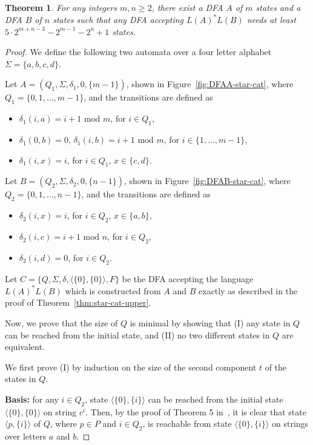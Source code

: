 \documentclass[10pt]{article}
\newtheorem{theorem}{Theorem}
\begin{document}
\begin{theorem}\label{thm:star-cat-lower}
For any integers $m,n \ge 2$, there exist a DFA $A$ of $m$ states and a DFA $B$ of $n$ states such that any DFA accepting $L(A)^* L(B)$ needs at least $5 \cdot 2^{m+n-3} - 2^{m-1} - 2^n +1$ states.
\end{theorem}
\begin{proof}
We define the following two automata over a four letter alphabet $\Sigma = \{a,b,c,d\}$.

Let $A = (Q_1, \Sigma, \delta_1, 0, \{m-1\})$, shown in Figure~\ref{fig:DFAA-star-cat}, where $Q_1 = \{0,1,\ldots,m-1\}$, and the transitions are defined as
    \begin{itemize}
    \item $\delta_1 (i, a) = i+1 \mbox{ mod } m$, for $i \in Q_1$,
    \item $\delta_1 (0, b) = 0$, $\delta_1 (i, b) = i+1 \mbox{ mod } m$, for $i \in \{1, \ldots, m-1\}$,
    \item $\delta_1 (i, x) = i$, for $i \in Q_1$, $x \in \{c,d\}$.
    \end{itemize}

Let $B = (Q_2, \Sigma, \delta_2, 0, \{n-1\})$, shown in Figure~\ref{fig:DFAB-star-cat}, where $Q_2 = \{0,1,\ldots,n-1\}$, and the transitions are defined as
    \begin{itemize}
    \item $\delta_2 (i, x) = i$, for $i \in Q_2$, $x \in \{a,b\}$,
    \item $\delta_2 (i, c) = i+1 \mbox{ mod } n$, for $i \in Q_2$,
    \item $\delta_2 (i, d) = 0$, for $i \in Q_2$.
    \end{itemize}

    Let $C = \{Q, \Sigma, \delta, \langle \{0\}, \{0\} \rangle, F\}$ be the DFA accepting the language $L(A)^*L(B)$ which is constructed from $A$ and $B$ exactly as described in the proof of Theorem~\ref{thm:star-cat-upper}.

    Now, we prove that the size of $Q$ is minimal by showing that (I) any state in $Q$ can be reached from the initial state, and (II) no two different states in $Q$ are equivalent.

    We first prove (I) by induction on the size of the second component $t$ of the states in $Q$.

    {\bf Basis:} for any $i \in Q_2$, state $\langle \{0\}, \{i\} \rangle$ can be reached from the initial state $\langle \{0\}, \{0\}\rangle$ on string $c^i$.
    Then, by the proof of Theorem 5 in~\cite{YuZhSa94}, it is clear that state $\langle p, \{i\}\rangle$ of $Q$, where $p \in P$ and $i \in Q_2$, is reachable from state $\langle \{0\}, \{i\}\rangle$ on strings over letters $a$ and $b$.


\end{proof}
\end{document}

